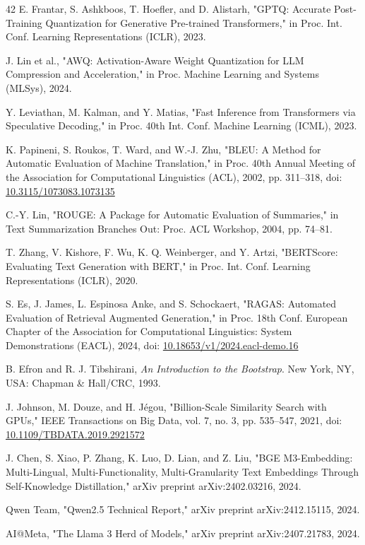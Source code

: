 \documentclass[pdflatex,sn-basic,Numbered]{sn-jnl}
\begin{document}
\begin{thebibliography}{42}
 E. Frantar, S. Ashkboos, T. Hoefler, and D. Alistarh, "GPTQ: Accurate Post-Training Quantization for Generative Pre-trained Transformers," in Proc. Int. Conf. Learning Representations (ICLR), 2023.

 J. Lin et al., "AWQ: Activation-Aware Weight Quantization for LLM Compression and Acceleration," in Proc. Machine Learning and Systems (MLSys), 2024.

 Y. Leviathan, M. Kalman, and Y. Matias, "Fast Inference from Transformers via Speculative Decoding," in Proc. 40th Int. Conf. Machine Learning (ICML), 2023.

 K. Papineni, S. Roukos, T. Ward, and W.-J. Zhu, "BLEU: A Method for Automatic Evaluation of Machine Translation," in Proc. 40th Annual Meeting of the Association for Computational Linguistics (ACL), 2002, pp. 311--318, doi: \href{https://doi.org/10.3115/1073083.1073135}{10.3115/1073083.1073135}

 C.-Y. Lin, "ROUGE: A Package for Automatic Evaluation of Summaries," in Text Summarization Branches Out: Proc. ACL Workshop, 2004, pp. 74--81.

 T. Zhang, V. Kishore, F. Wu, K. Q. Weinberger, and Y. Artzi, "BERTScore: Evaluating Text Generation with BERT," in Proc. Int. Conf. Learning Representations (ICLR), 2020.

 S. Es, J. James, L. Espinosa Anke, and S. Schockaert, "RAGAS: Automated Evaluation of Retrieval Augmented Generation," in Proc. 18th Conf. European Chapter of the Association for Computational Linguistics: System Demonstrations (EACL), 2024, doi: \href{https://doi.org/10.18653/v1/2024.eacl-demo.16}{10.18653/v1/2024.eacl-demo.16}

 B. Efron and R. J. Tibshirani, \textit{An Introduction to the Bootstrap}. New York, NY, USA: Chapman \& Hall/CRC, 1993.

 J. Johnson, M. Douze, and H. Jégou, "Billion-Scale Similarity Search with GPUs," IEEE Transactions on Big Data, vol. 7, no. 3, pp. 535--547, 2021, doi: \href{https://doi.org/10.1109/TBDATA.2019.2921572}{10.1109/TBDATA.2019.2921572}

 J. Chen, S. Xiao, P. Zhang, K. Luo, D. Lian, and Z. Liu, "BGE M3-Embedding: Multi-Lingual, Multi-Functionality, Multi-Granularity Text Embeddings Through Self-Knowledge Distillation," arXiv preprint arXiv:2402.03216, 2024.

 Qwen Team, "Qwen2.5 Technical Report," arXiv preprint arXiv:2412.15115, 2024.

 AI@Meta, "The Llama 3 Herd of Models," arXiv preprint arXiv:2407.21783, 2024.

\end{thebibliography}
\end{document}
